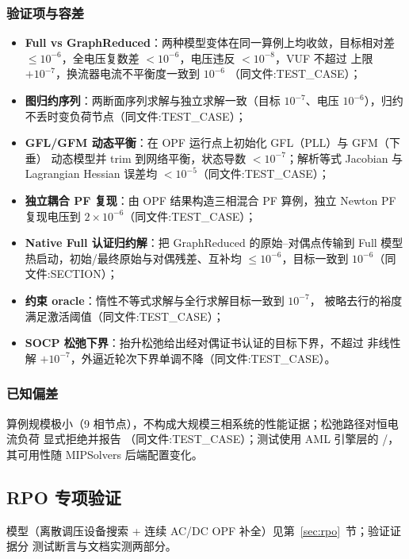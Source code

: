 \subsubsection*{验证项与容差}
\begin{itemize}
  \item \textbf{Full vs GraphReduced}：两种模型变体在同一算例上均收敛，目标相对差
        $\le10^{-6}$，全电压复数差 $<10^{-6}$，电压违反 $<10^{-8}$，VUF 不超过
        上限 $+10^{-7}$，换流器电流不平衡度一致到 $10^{-6}$
        （同文件:TEST\_CASE）；
  \item \textbf{图归约序列}：两断面序列求解与独立求解一致（目标 $10^{-7}$、电压
        $10^{-6}$），归约不丢时变负荷节点（同文件:TEST\_CASE）；
  \item \textbf{GFL/GFM 动态平衡}：在 OPF 运行点上初始化 GFL（PLL）与 GFM（下垂）
        动态模型并 trim 到网络平衡，状态导数 $<10^{-7}$；解析等式 Jacobian 与
        Lagrangian Hessian 误差均 $<10^{-5}$（同文件:TEST\_CASE）；
  \item \textbf{独立耦合 PF 复现}：由 OPF 结果构造三相混合 PF 算例，独立 Newton
        PF 复现电压到 $2\times10^{-6}$（同文件:TEST\_CASE）；
  \item \textbf{Native Full 认证归约解}：把 GraphReduced 的原始--对偶点传输到 Full
        模型热启动，初始/最终原始与对偶残差、互补均 $\le10^{-6}$，目标一致到
        $10^{-6}$（同文件:SECTION）；
  \item \textbf{约束 oracle}：惰性不等式求解与全行求解目标一致到 $10^{-7}$，
        被略去行的裕度满足激活阈值（同文件:TEST\_CASE）；
  \item \textbf{SOCP 松弛下界}：抬升松弛给出经对偶证书认证的目标下界，不超过
        非线性解 $+10^{-7}$，外逼近轮次下界单调不降（同文件:TEST\_CASE）。
\end{itemize}

\subsubsection*{已知偏差}
算例规模极小（9 相节点），不构成大规模三相系统的性能证据；松弛路径对恒电流负荷
显式拒绝并报告 （同文件:TEST\_CASE）；测试使用 AML 引擎层的
/，其可用性随 MIPSolvers 后端配置变化。


\subsection{RPO 专项验证}\label{subsec:ver:rpo}

模型（离散调压设备搜索 + 连续 AC/DC OPF 补全）见第~\ref{sec:rpo}~节；验证证据分
测试断言与文档实测两部分。

